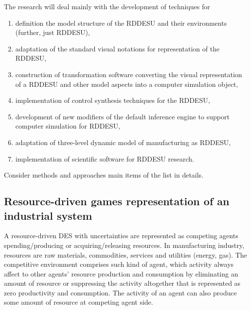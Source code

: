 \documentclass[conference]{IEEEtran}
\begin{document}

The research will deal mainly with the development of techniques for
\begin{enumerate}
\item definition the model structure of the RDDESU and their environments (further, just RDDESU),
\item adaptation of the standard visual notations for representation of the RDDESU,
\item construction of transformation software converting the visual representation of a RDDESU and other model aspects into a computer simulation object,
\item implementation of control synthesis techniques for the RDDESU,
\item development of new modifiers of the default inference engine to support computer simulation for RDDESU,
\item adaptation of three-level dynamic model of manufacturing as RDDESU,
\item implementation of scientific software for RDDESU research.
\end{enumerate}

Consider methods and approaches main items of the list in details.

\subsection{Resource-driven games representation of an industrial system}
\label{sec:sub-rbg}

A resource-driven DES with uncertainties are represented as competing agents spending/producing or acquiring/releasing resources. In manufacturing industry, resources are raw materials, commodities, services and utilities (energy, gas). The competitive environment comprises such kind of agent, which activity always affect to other agents' resource production and consumption by eliminating an amount of resource or suppressing the activity altogether that is represented as zero productivity and consumption. The activity of an agent can also produce some amount of resource at competing agent side.
\end{document}

